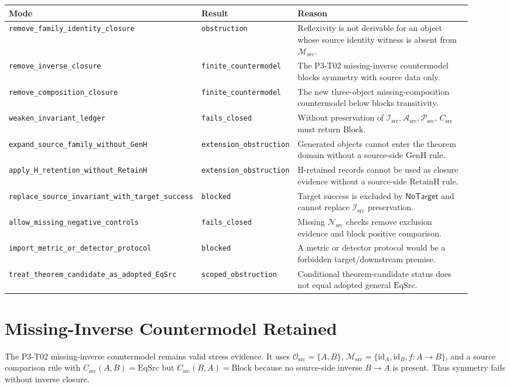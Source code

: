 \documentclass[11pt]{article}
\newcommand{\EqSrc}{\mathrm{EqSrc}}
\newcommand{\Block}{\mathrm{Block}}
\newcommand{\RetainH}{\mathrm{RetainH}}
\newcommand{\GenH}{\mathrm{GenH}}
\newcommand{\Osrc}{\mathcal{O}_{\mathrm{src}}}
\newcommand{\Msrc}{\mathcal{M}_{\mathrm{src}}}
\newcommand{\Isrc}{\mathcal{I}_{\mathrm{src}}}
\newcommand{\Asrc}{\mathcal{A}_{\mathrm{src}}}
\newcommand{\Psrc}{\mathcal{P}_{\mathrm{src}}}
\newcommand{\Nsrc}{\mathcal{N}_{\mathrm{src}}}
\newcommand{\Csrc}{C_{\mathrm{src}}}
\newcommand{\NoTarget}{\mathsf{NoTarget}}
\begin{document}
\begin{longtable}{p{0.30\linewidth}p{0.20\linewidth}p{0.42\linewidth}}
\toprule
Mode & Result & Reason \\
\midrule
\texttt{remove\_family\_identity\_closure} & \texttt{obstruction} & Reflexivity is not derivable for an object whose source identity witness is absent from \(\Msrc\). \\
\texttt{remove\_inverse\_closure} & \texttt{finite\_countermodel} & The P3-T02 missing-inverse countermodel blocks symmetry with source data only. \\
\texttt{remove\_composition\_closure} & \texttt{finite\_countermodel} & The new three-object missing-composition countermodel below blocks transitivity. \\
\texttt{weaken\_invariant\_ledger} & \texttt{fails\_closed} & Without preservation of \(\Isrc,\Asrc,\Psrc\), \(\Csrc\) must return \(\Block\). \\
\texttt{expand\_source\_family\_without\_GenH} & \texttt{extension\_obstruction} & Generated objects cannot enter the theorem domain without a source-side \(\GenH\) rule. \\
\texttt{apply\_H\_retention\_without\_RetainH} & \texttt{extension\_obstruction} & H-retained records cannot be used as closure evidence without a source-side \(\RetainH\) rule. \\
\texttt{replace\_source\_invariant\_with\_target\_success} & \texttt{blocked} & Target success is excluded by \(\NoTarget\) and cannot replace \(\Isrc\) preservation. \\
\texttt{allow\_missing\_negative\_controls} & \texttt{fails\_closed} & Missing \(\Nsrc\) checks remove exclusion evidence and block positive comparison. \\
\texttt{import\_metric\_or\_detector\_protocol} & \texttt{blocked} & A metric or detector protocol would be a forbidden target/downstream premise. \\
\texttt{treat\_theorem\_candidate\_as\_adopted\_EqSrc} & \texttt{scoped\_obstruction} & Conditional theorem-candidate status does not equal adopted general \(\EqSrc\). \\
\bottomrule
\end{longtable}

\section{Missing-Inverse Countermodel Retained}

The P3-T02 missing-inverse countermodel remains valid stress evidence. It uses
\(\Osrc=\{A,B\}\), \(\Msrc=\{\mathrm{id}_{A},\mathrm{id}_{B},f:A\to B\}\),
and a source comparison rule with \(\Csrc(A,B)=\EqSrc\) but
\(\Csrc(B,A)=\Block\) because no source-side inverse \(B\to A\) is present.
Thus symmetry fails without inverse closure.
\end{document}

